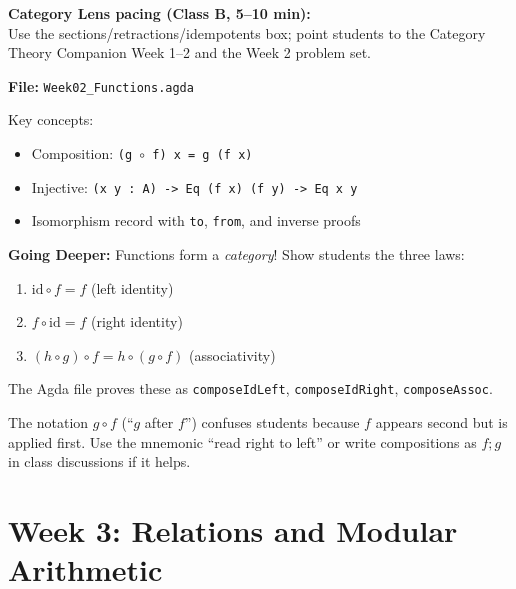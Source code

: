 \documentclass[11pt]{article}
\begin{document}
\textbf{Category Lens pacing (Class B, 5--10 min):}\\
Use the sections/retractions/idempotents box; point students to the Category Theory Companion Week 1--2 and the Week 2 problem set.

\begin{agdabox}
\textbf{File:} \texttt{Week02\_Functions.agda}

Key concepts:
\begin{itemize}
    \item Composition: \texttt{(g $\circ$ f) x = g (f x)}
    \item Injective: \texttt{(x y : A) -> Eq (f x) (f y) -> Eq x y}
    \item Isomorphism record with \texttt{to}, \texttt{from}, and inverse proofs
\end{itemize}

\textbf{Going Deeper:} Functions form a \textit{category}! Show students the three laws:
\begin{enumerate}
    \item $\text{id} \circ f = f$ (left identity)
    \item $f \circ \text{id} = f$ (right identity)
    \item $(h \circ g) \circ f = h \circ (g \circ f)$ (associativity)
\end{enumerate}
The Agda file proves these as \texttt{composeIdLeft}, \texttt{composeIdRight}, \texttt{composeAssoc}.
\end{agdabox}

\begin{tipbox}
The notation $g \circ f$ (``$g$ after $f$'') confuses students because $f$ appears second but is applied first. Use the mnemonic ``read right to left'' or write compositions as $f; g$ in class discussions if it helps.
\end{tipbox}

\newpage
\section{Week 3: Relations and Modular Arithmetic}
\end{document}
